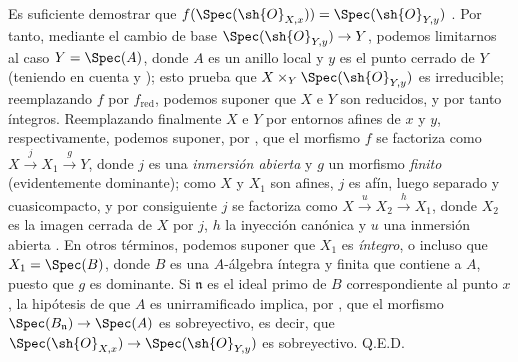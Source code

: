 Es suficiente demostrar que $f(\Spec(\sh{O}_{X,x}))=\Spec(\sh{O}_{Y,y})$ .
Por tanto, mediante el cambio de base $\Spec(\sh{O}_{Y,y})\to Y$, podemos limitarnos al caso $Y=\Spec(A)$, donde $A$ es un anillo local y $y$ es el punto cerrado de $Y$ (teniendo en cuenta  y ); esto prueba que $X\times_Y\Spec(\sh{O}_{Y,y})$ es irreducible; reemplazando $f$ por $f_{\mathrm{red}}$, podemos suponer que $X$ e $Y$ son reducidos, y por tanto íntegros.
Reemplazando finalmente $X$ e $Y$ por entornos afines de $x$ y $y$, respectivamente, podemos suponer, por , que el morfismo $f$ se factoriza como $X\xrightarrow{j}X_1\xrightarrow{g}Y$, donde $j$ es una \emph{inmersión abierta} y $g$ un morfismo \emph{finito} (evidentemente dominante); como $X$ y $X_1$ son afines, $j$ es afín, luego separado y cuasicompacto, y por consiguiente $j$ se factoriza como $X\xrightarrow{u}X_2\xrightarrow{h}X_1$, donde $X_2$ es la imagen cerrada de $X$ por $j$, $h$ la inyección canónica y $u$ una inmersión abierta .
En otros términos, podemos suponer que $X_1$ es \emph{íntegro}, o incluso que $X_1=\Spec(B)$, donde $B$ es una $A$-álgebra íntegra y finita que contiene a $A$, puesto que $g$ es dominante. Si $\mathfrak{n}$ es el ideal primo de $B$ correspondiente al punto $x$, la hipótesis de que $A$ es unirramificado implica, por , que el morfismo $\Spec(B_\mathfrak{n})\to\Spec(A)$ es sobreyectivo, es decir, que $\Spec(\sh{O}_{X,x})\to\Spec(\sh{O}_{Y,y})$ es sobreyectivo.
Q.E.D.

